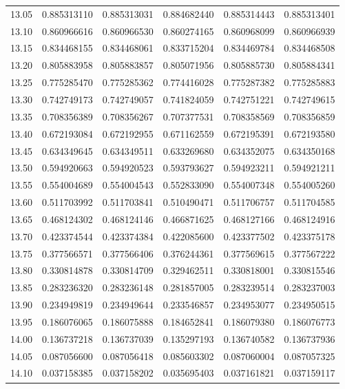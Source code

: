\documentclass[11pt,a4paper]{article}
\begin{document}
\begin{longtable}{rrrrrr}
13.05 & 0.885313110 & 0.885313031 & 0.884682440 & 0.885314443 & 0.885313401 \\
13.10 & 0.860966616 & 0.860966530 & 0.860274165 & 0.860968099 & 0.860966939 \\
13.15 & 0.834468155 & 0.834468061 & 0.833715204 & 0.834469784 & 0.834468508 \\
13.20 & 0.805883958 & 0.805883857 & 0.805071956 & 0.805885730 & 0.805884341 \\
13.25 & 0.775285470 & 0.775285362 & 0.774416028 & 0.775287382 & 0.775285883 \\
13.30 & 0.742749173 & 0.742749057 & 0.741824059 & 0.742751221 & 0.742749615 \\
13.35 & 0.708356389 & 0.708356267 & 0.707377531 & 0.708358569 & 0.708356859 \\
13.40 & 0.672193084 & 0.672192955 & 0.671162559 & 0.672195391 & 0.672193580 \\
13.45 & 0.634349645 & 0.634349511 & 0.633269680 & 0.634352075 & 0.634350168 \\
13.50 & 0.594920663 & 0.594920523 & 0.593793627 & 0.594923211 & 0.594921211 \\
13.55 & 0.554004689 & 0.554004543 & 0.552833090 & 0.554007348 & 0.554005260 \\
13.60 & 0.511703992 & 0.511703841 & 0.510490471 & 0.511706757 & 0.511704585 \\
13.65 & 0.468124302 & 0.468124146 & 0.466871625 & 0.468127166 & 0.468124916 \\
13.70 & 0.423374544 & 0.423374384 & 0.422085600 & 0.423377502 & 0.423375178 \\
13.75 & 0.377566571 & 0.377566406 & 0.376244361 & 0.377569615 & 0.377567222 \\
13.80 & 0.330814878 & 0.330814709 & 0.329462511 & 0.330818001 & 0.330815546 \\
13.85 & 0.283236320 & 0.283236148 & 0.281857005 & 0.283239514 & 0.283237003 \\
13.90 & 0.234949819 & 0.234949644 & 0.233546857 & 0.234953077 & 0.234950515 \\
13.95 & 0.186076065 & 0.186075888 & 0.184652841 & 0.186079380 & 0.186076773 \\
14.00 & 0.136737218 & 0.136737039 & 0.135297193 & 0.136740582 & 0.136737936 \\
14.05 & 0.087056600 & 0.087056418 & 0.085603302 & 0.087060004 & 0.087057325 \\
14.10 & 0.037158385 & 0.037158202 & 0.035695403 & 0.037161821 & 0.037159117 \\

\end{longtable}
\end{document}
